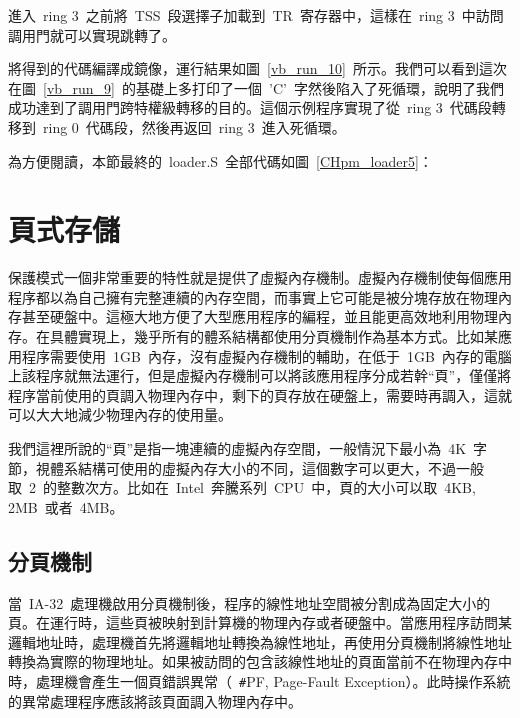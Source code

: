 進入~ring 3~之前將~TSS~段選擇子加載到~TR~寄存器中，這樣在~ring 3~中訪問調用門就可以實現跳轉了。

\label{CHpm_tss_load}

將得到的代碼編譯成鏡像，運行結果如圖~\ref{vb_run_10}~所示。我們可以看到這次在圖~\ref{vb_run_9}~的基礎上多打印了一個~'C'~字然後陷入了死循環，說明了我們成功達到了調用門跨特權級轉移的目的。這個示例程序實現了從~ring 3~代碼段轉移到~ring 0~代碼段，然後再返回~ring 3~進入死循環。


為方便閱讀，本節最終的~loader.S~全部代碼如圖~\ref{CHpm_loader5}：

\label{CHpm_loader5}

\section{頁式存儲}

保護模式一個非常重要的特性就是提供了虛擬內存機制。虛擬內存機制使每個應用程序都以為自己擁有完整連續的內存空間，而事實上它可能是被分塊存放在物理內存甚至硬盤中。這極大地方便了大型應用程序的編程，並且能更高效地利用物理內存。在具體實現上，幾乎所有的體系結構都使用分頁機制作為基本方式。比如某應用程序需要使用~1GB~內存，沒有虛擬內存機制的輔助，在低于~1GB~內存的電腦上該程序就無法運行，但是虛擬內存機制可以將該應用程序分成若幹“頁”，僅僅將程序當前使用的頁調入物理內存中，剩下的頁存放在硬盤上，需要時再調入，這就可以大大地減少物理內存的使用量。

我們這裡所說的“頁”是指一塊連續的虛擬內存空間，一般情況下最小為~4K~字節，視體系結構可使用的虛擬內存大小的不同，這個數字可以更大，不過一般取~2~的整數次方。比如在~Intel~奔騰系列~CPU~中，頁的大小可以取~4KB, 2MB~或者~4MB。

\subsection{分頁機制}

當~IA-32~處理機啟用分頁機制後，程序的線性地址空間被分割成為固定大小的頁。在運行時，這些頁被映射到計算機的物理內存或者硬盤中。當應用程序訪問某邏輯地址時，處理機首先將邏輯地址轉換為線性地址，再使用分頁機制將線性地址轉換為實際的物理地址。如果被訪問的包含該線性地址的頁面當前不在物理內存中時，處理機會產生一個頁錯誤異常（~\texttt{\#}PF, Page-Fault Exception）。此時操作系統的異常處理程序應該將該頁面調入物理內存中。


